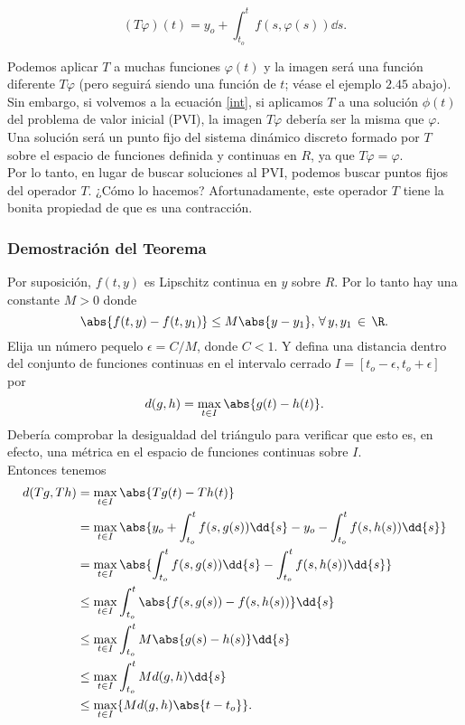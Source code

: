 	$$ (T\varphi) (t) = y_o + \int _{t_o} ^t f(s,\varphi (s)) \dd{s}. $$

Podemos aplicar $T$ a muchas funciones $\varphi (t)$ y la imagen será una función diferente $T\varphi$ (pero seguirá siendo una función de $t$; véase el ejemplo $2.45$ abajo). Sin embargo, si volvemos a la ecuación \eqref{int}, si aplicamos $T$ a una solución $\phi (t)$ del problema de valor inicial (PVI), la imagen $T\varphi$ debería ser la misma que $\varphi$. Una solución será un punto fijo del sistema dinámico discreto formado por $T$ sobre el espacio de funciones definida y continuas en $R$, ya que $T\varphi = \varphi$. \\

Por lo tanto, en lugar de buscar soluciones al PVI, podemos buscar puntos fijos del operador $T$. ¿Cómo lo hacemos? Afortunadamente, este operador $T$ tiene la bonita propiedad de que es una contracción.

\subsubsection*{Demostración del Teorema}

Por suposición, $f(t,y)$ es Lipschitz continua en $y$ sobre $R$. Por lo tanto hay una constante $M > 0$ donde
	$$ \abs{f(t,y) - f(t,y_1)} \leq M \abs{y - y_1}, \, \forall \, y,y_1 \, \in \, \R . $$
Elija un número pequelo $\epsilon = C/M$, donde $C < 1$. Y defina una distancia dentro del conjunto de funciones continuas en el intervalo cerrado $I = [t_o - \epsilon ,t_o + \epsilon]$ por
	$$ d(g,h) = \max _{t\in I} \abs{g(t) - h(t)}. $$
Debería comprobar la desigualdad del triángulo para verificar que esto es, en efecto, una métrica en el espacio de funciones continuas sobre $I$. \\

Entonces tenemos
\begin{align}	
	d(Tg,Th) &= \max _{t\in I} \abs{Tg(t) - Th(t)} \\
	&= \max _{t\in I} \abs{y_o + \int _{t_o} ^ t f(s,g(s)) \dd{s} - y_o - \int _{t_o} ^t f(s,h(s)) \dd{s} } \\
	&= \max _{t\in I} \abs{\int _{t_o} ^ t f(s,g(s)) \dd{s} - \int _{t_o} ^t f(s,h(s)) \dd{s} } \\
	&\leq \max _{t\in I} \int _{t_o} ^ t \abs{ f(s,g(s)) - f(s,h(s)) } \dd{s} \\
	&\leq \max _{t\in I} \int _{t_o} ^ t M \abs{ g(s) - h(s) } \dd{s} \\
	&\leq \max _{t\in I} \int _{t_o} ^ t M d(g,h) \dd{s} \\
	&\leq \max _{t\in I} \{ M d(g,h) \abs{t - t_o} \} .
\end{align}


